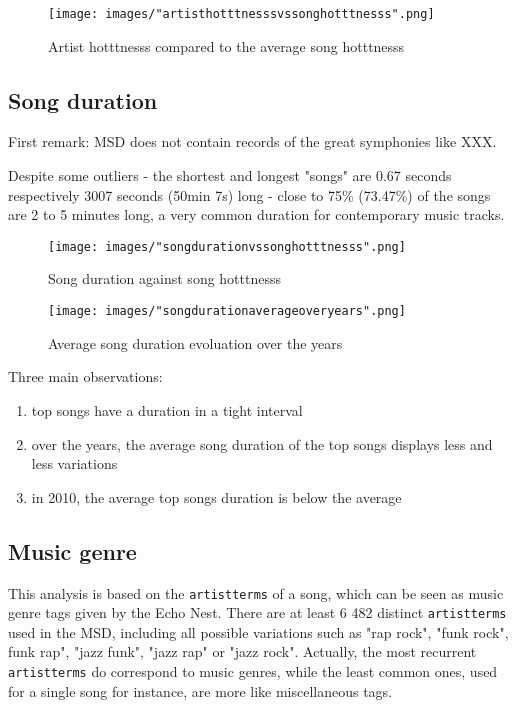 \documentclass[11pt]{article}
\renewcommand\_{\textunderscore\allowbreak}
\begin{document}
\begin{figure}[h!]
\centering
\captionsetup{width=1.0\textwidth}
\texttt{[image: images/"artist\_hotttnesss\_vs\_song\_hotttnesss".png]}
\caption{Artist hotttnesss compared to the average song hotttnesss}
\label{fig:artist_hotttnesss}
\end{figure}



\subsection{Song duration}
First remark: MSD does not contain records of the great symphonies like XXX. 

Despite some outliers - the shortest and longest "songs" are 0.67 seconds respectively 3007 seconds (50min 7s) long - close to 75\% (73.47\%) of the songs are 2 to 5 minutes long, a very common duration for contemporary music tracks.

\begin{figure}[h!]
\centering
\captionsetup{width=1.0\textwidth}
\texttt{[image: images/"song\_duration\_vs\_song\_hotttnesss".png]}
\caption{Song duration against song hotttnesss}
\label{fig:song_duration}
\end{figure}

\begin{figure}[h!]
\centering
\captionsetup{width=1.0\textwidth}
\texttt{[image: images/"song\_duration\_average\_over\_years".png]}
\caption{Average song duration evoluation over the years}
\label{fig:song_duration_over_years}
\end{figure}

Three main observations:
\begin{enumerate}
\itemsep 0mm
\item top songs have a duration in a tight interval
\item over the years, the average song duration of the top songs displays less and less variations
\item in 2010, the average top songs duration is below the average
\end{enumerate}



\subsection{Music genre}
This analysis is based on the \texttt{artist\_terms} of a song, which can be seen as music genre tags given by the Echo Nest.
There are at least 6 482 distinct \texttt{artist\_terms} used in the MSD, including all possible variations such as "rap rock", "funk rock", funk rap", "jazz funk", "jazz rap" or "jazz rock".
Actually, the most recurrent \texttt{artist\_terms} do correspond to music genres, while the least common ones, used for a single song for instance, are more like miscellaneous tags.
\end{document}
